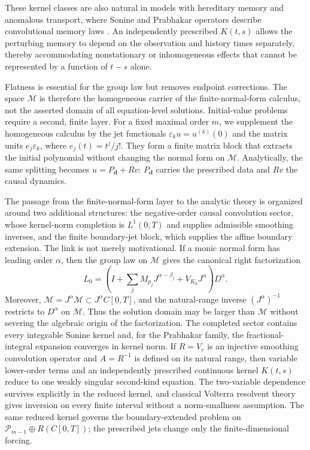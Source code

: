 \documentclass[11pt]{article}
\numberwithin{equation}{section}
\theoremstyle{definition}
\theoremstyle{remark}
\newcommand{\M}{\mathcal M}
\begin{document}
These kernel classes are also natural in models with hereditary memory and anomalous transport, where Sonine and Prabhakar operators describe convolutional memory laws \cite{Podlubny1999,Giusti2020}. An independently prescribed $K(t,s)$ allows the perturbing memory to depend on the observation and history times separately, thereby accommodating nonstationary or inhomogeneous effects that cannot be represented by a function of $t-s$ alone.

Flatness is essential for the group law but removes endpoint corrections. The space $\M$ is therefore the homogeneous carrier of the finite-normal-form calculus, not the asserted domain of all equation-level solutions. Initial-value problems require a second, finite layer. For a fixed maximal order $m$, we supplement the homogeneous calculus by the jet functionals $\varepsilon_k u=u^{(k)}(0)$ and the matrix units $e_j\varepsilon_k$, where $e_j(t)=t^j/j!$. They form a finite matrix block that extracts the initial polynomial without changing the normal form on $\M$. Analytically, the same splitting becomes $u=P_{\mathbf d}+Rv$: $P_{\mathbf d}$ carries the prescribed data and $Rv$ the causal dynamics.

The passage from the finite-normal-form layer to the analytic theory is organized around two additional structures: the negative-order causal convolution sector, whose kernel-norm completion is $L^1(0,T)$ and supplies admissible smoothing inverses, and the finite boundary-jet block, which supplies the affine boundary extension. The link is not merely motivational. If a monic normal form has leading order $\alpha$, then the group law on $\M$ gives the canonical right factorization
\begin{equation*}
L_0=\left(I+\sum_j M_{p_j}J^{\alpha-\beta_j}+V_{K_0}J^\alpha\right)D^\alpha.
\end{equation*}
Moreover, $\M=J^\alpha\M\subset J^\alpha C[0,T]$, and the natural-range inverse $(J^\alpha)^{-1}$ restricts to $D^\alpha$ on $\M$. Thus the solution domain may be larger than $\M$ without severing the algebraic origin of the factorization. The completed sector contains every integrable Sonine kernel and, for the Prabhakar family, the fractional-integral expansion converges in kernel norm. If $R=V_r$ is an injective smoothing convolution operator and $A=R^{-1}$ is defined on its natural range, then variable lower-order terms and an independently prescribed continuous kernel $K(t,s)$ reduce to one weakly singular second-kind equation. The two-variable dependence survives explicitly in the reduced kernel, and classical Volterra resolvent theory gives inversion on every finite interval without a norm-smallness assumption. The same reduced kernel governs the boundary-extended problem on $\mathcal P_{m-1}\oplus R(C[0,T])$; the prescribed jets change only the finite-dimensional forcing.
\end{document}
